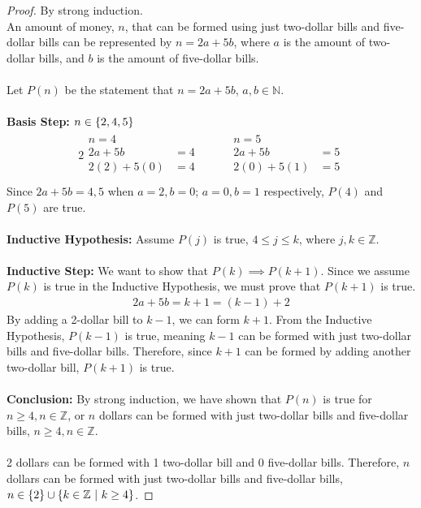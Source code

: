\documentclass[article,12pt]{article}
\DeclarePairedDelimiter\set{\{}{\}}
\newcommand{\unite}{\cup}
\newcommand{\ints}{\mathbb{Z}}
\newcommand{\nats}{\mathbb{N}}
\begin{document}
\begin{proof}
    By strong induction. \\
    An amount of money, $n$, that can be formed using just two-dollar bills and five-dollar bills can be represented by $n=2a+5b$, where $a$ is the amount of two-dollar bills, and $b$ is the amount of five-dollar bills. \\
    \\
    Let $P(n)$ be the statement that $n=2a+5b$, $a, b \in \nats$. \\
    \\
    \textbf{Basis Step: $n \in \set*{2, 4, 5}$}
    \begin{alignat*}{2}
        \begin{aligned}
            n = 4 \\
            2a + 5b &= 4 \\
            2(2) + 5(0) &= 4 \\
        \end{aligned} \quad &&
        \begin{aligned}
            n = 5 \\
            2a + 5b &= 5 \\
            2(0) + 5(1) &= 5 \\
        \end{aligned}
    \end{alignat*}
    Since $2a+5b=4,5$ when $a=2,b=0$; $a=0,b=1$ respectively, $P(4)$ and $P(5)$ are true. \\
    \\
    \textbf{Inductive Hypothesis:} Assume $P(j)$ is true, $4 \leq j \leq k$, where $j,k \in \ints$. \\
    \\
    \textbf{Inductive Step:} We want to show that $P(k)\implies P(k+1)$. Since we assume $P(k)$ is true in the Inductive Hypothesis, we must prove that $P(k+1)$ is true.
    \begin{align*}
        2a + 5b = k+1 = (k - 1) + 2 
    \end{align*}   
    By adding a 2-dollar bill to $k-1$, we can form $k+1$. From the Inductive Hypothesis, $P(k-1)$ is true, meaning $k-1$ can be formed with just two-dollar bills and five-dollar bills. Therefore, since $k+1$ can be formed by adding another two-dollar bill, $P(k+1)$ is true. \\
    \\
    \textbf{Conclusion:} By strong induction, we have shown that $P(n)$ is true for $n \geq 4, n \in \ints$, or $n$ dollars can be formed with just two-dollar bills and five-dollar bills, $n \geq 4, n \in \ints$. \\
    \\
    2 dollars can be formed with 1 two-dollar bill and 0 five-dollar bills. Therefore, $n$ dollars can be formed with just two-dollar bills and five-dollar bills, $n \in \set*{2} \unite \set*{k \in \ints \ | \ k \geq 4}$.
\end{proof}
\end{document}
